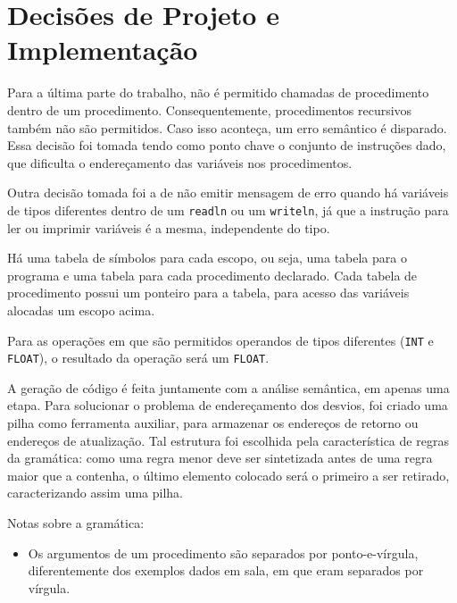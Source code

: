\section{Decisões de Projeto e Implementação}

Para a última parte do trabalho, não é permitido chamadas de
procedimento dentro de um procedimento. Consequentemente, procedimentos
recursivos também não são permitidos. Caso isso aconteça, um erro semântico é
disparado. Essa decisão foi tomada tendo como ponto chave o conjunto de
instruções dado, que dificulta o endereçamento das variáveis nos procedimentos.

Outra decisão tomada foi a de não emitir mensagem de erro quando há variáveis
de tipos diferentes dentro de um \texttt{readln} ou um \texttt{writeln}, já que
a instrução para ler ou imprimir variáveis é a mesma, independente do tipo.

Há uma tabela de símbolos para cada escopo, ou seja, uma tabela para o programa
e uma tabela para cada procedimento declarado. Cada tabela de procedimento
possui um ponteiro para a tabela, para acesso das variáveis alocadas um escopo
acima.

Para as operações em que são permitidos operandos de tipos diferentes 
(\texttt{INT} e \texttt{FLOAT}), o resultado da operação será um \texttt{FLOAT}.

A geração de código é feita juntamente com a análise semântica, em apenas uma
etapa. Para solucionar o problema de endereçamento dos desvios, foi criado uma
pilha como ferramenta auxiliar, para armazenar os endereços de retorno ou
endereços de atualização. Tal estrutura foi escolhida pela característica de
regras da gramática: como uma regra menor deve ser sintetizada antes de uma
regra maior que a contenha, o último elemento colocado será o primeiro a ser
retirado, caracterizando assim uma pilha.

Notas sobre a gramática:
\begin{itemize}
	\item Os argumentos de um procedimento são separados por ponto-e-vírgula,
	diferentemente dos exemplos dados em sala, em que eram separados por
	vírgula.
\end{itemize}


